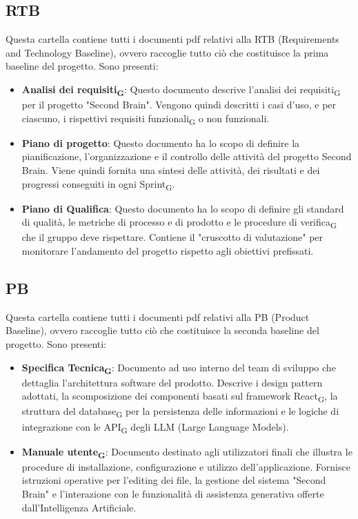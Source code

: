 \documentclass[11pt,a4paper]{article}
\newcommand{\gls}[1]{#1\textsubscript{G}}
\begin{document}
\subsection{RTB}
Questa cartella contiene tutti i documenti pdf relativi alla RTB (Requirements and Technology Baseline), ovvero raccoglie tutto ciò che costituisce la prima baseline del progetto. Sono presenti:
\begin{itemize}
    \item \textbf{\gls{Analisi dei requisiti}}: Questo documento descrive l'\gls{analisi dei requisiti} per il progetto "Second Brain". Vengono quindi descritti i casi d'uso, e per ciascuno, i rispettivi \gls{requisiti funzionali} o non funzionali.
    
    \item \textbf{Piano di progetto}: Questo documento ha lo scopo di definire la pianificazione, l’organizzazione e il controllo delle attività del progetto Second Brain. Viene quindi fornita una sintesi delle attività, dei risultati e dei progressi conseguiti in ogni \gls{Sprint}.
    
    \item \textbf{Piano di Qualifica}: Questo documento ha lo scopo di definire gli standard di qualità, le metriche di processo e di prodotto e le procedure di \gls{verifica} che il gruppo deve rispettare. Contiene il "cruscotto di valutazione" per monitorare l'andamento del progetto rispetto agli obiettivi prefissati.
\end{itemize}


\subsection{PB}
Questa cartella contiene tutti i documenti pdf relativi alla PB (Product Baseline), ovvero raccoglie tutto ciò che costituisce la seconda baseline del progetto. Sono presenti:
\begin{itemize}
    \item \textbf{\gls{Specifica Tecnica}}: Documento ad uso interno del team di sviluppo che dettaglia l'architettura software del prodotto. Descrive i design pattern adottati, la scomposizione dei componenti basati sul framework \gls{React}, la struttura del \gls{database} per la persistenza delle informazioni e le logiche di integrazione con le \gls{API} degli LLM (Large Language Models).
    \item \textbf{\gls{Manuale utente}}: Documento destinato agli utilizzatori finali che illustra le procedure di installazione, configurazione e utilizzo dell'applicazione. Fornisce istruzioni operative per l'editing dei file, la gestione del sistema "Second Brain" e l'interazione con le funzionalità di assistenza generativa offerte dall'Intelligenza Artificiale.
\end{itemize}
\end{document}
